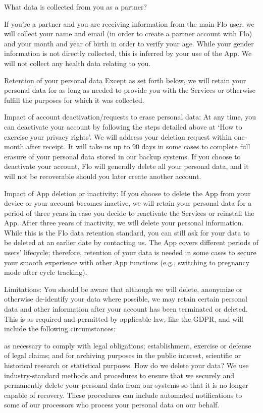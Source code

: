 What data is collected from you as a partner? 

If you’re a partner and you are receiving information from the main Flo user, we will collect your name and email (in order to create a partner account with Flo) and your month and year of birth in order to verify your age. While your gender information is not directly collected, this is inferred by your use of the App. We will not collect any health data relating to you.

Retention of your personal data
Except as set forth below, we will retain your personal data for as long as needed to provide you with the Services or otherwise fulfill the purposes for which it was collected. 

Impact of account deactivation/requests to erase personal data: At any time, you can deactivate your account by following the steps detailed above at ‘How to exercise your privacy rights’. We will address your deletion request within one-month after receipt. It will take us up to 90 days in some cases to complete full erasure of your personal data stored in our backup systems. If you choose to deactivate your account, Flo will generally delete all your personal data, and it will not be recoverable should you later create another account. 

Impact of App deletion or inactivity: If you choose to delete the App from your device or your account becomes inactive, we will retain your personal data for a period of three years in case you decide to reactivate the Services or reinstall the App. After three years of inactivity, we will delete your personal information. While this is the Flo data retention standard, you can still ask for your data to be deleted at an earlier date by contacting us. The App covers different periods of users’ lifecycle; therefore, retention of your data is needed in some cases to secure your smooth experience with other App functions (e.g., switching to pregnancy mode after cycle tracking). 

Limitations: You should be aware that although we will delete, anonymize or otherwise de-identify your data where possible, we may retain certain personal data and other information after your account has been terminated or deleted. This is as required and permitted by applicable law, like the GDPR, and will include the following circumstances: 

as necessary to comply with legal obligations; 
establishment, exercise or defense of legal claims; and 
for archiving purposes in the public interest, scientific or historical research or statistical purposes.
How do we delete your data?
We use industry-standard methods and procedures to ensure that we securely and permanently delete your personal data from our systems so that it is no longer capable of recovery. These procedures can include automated notifications to some of our processors who process your personal data on our behalf.

